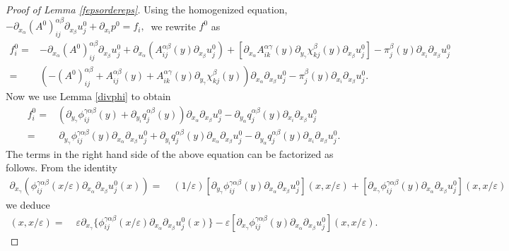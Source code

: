 \documentclass[11pt, reqno]{amsart}
\theoremstyle{definition}
\theoremstyle{remark}
\numberwithin{equation}{section}
\begin{document}
\begin{proof}[Proof  of \textup{Lemma \ref{fepsordereps}}]
		\noindent 	Using the homogenized equation,  $	-\partial_{x_\alpha}(A^0)^{\alpha\beta}_{ij}\partial_{x_\beta}	\! u_j^0   +  \partial_{x_i} p^0 =f_i,\ $    we rewrite  $f^0$ as
		\begin{align*}
			f_i^0=&-\partial_{x_\alpha}(A^0)^{\alpha\beta}_{ij}\partial_{x_\beta}	\! u_j^0 +\partial_{x_\alpha}\left(A^{\alpha\beta}_{ij}(y)\partial_{x_\beta}	\! u_j^0 \right) + [ \partial_{x_\alpha} A^{\alpha\gamma}_{ik}(y)\partial_{y_\gamma}	\chi^{\beta}_{kj}(y)\partial_{ x_{\beta}}  u^0_j]-  \pi^{\beta}_{j}(y)\partial_{x_i} \partial_{ x_{\beta}}  u^0_j\\
			=&\left(  - (A^0)^{\alpha\beta}_{ij} +A^{\alpha\beta}_{ij}(y) +   A^{\alpha\gamma}_{ik}(y)\partial_{y_\gamma}	\chi^{\beta}_{kj}(y)  \right) \partial_{x_\alpha} \partial_{ x_{\beta}}  u^0_j-  \pi^{\beta}_{j}(y)\partial_{x_i} \partial_{ x_{\beta}}  u^0_j.
		\end{align*}  
		Now we use Lemma \ref{divphi} to obtain
		\begin{align*}
			f_i^0=& \left(\partial_{y_\gamma} \phi^{\gamma\alpha\beta}_{ij}(y) + \partial_{y_i} q^{\alpha\beta}_{j} (y)  \right) \partial_{x_\alpha}  \partial_{x_\beta} u_j^0  -\partial_{y_\alpha}q^{\alpha\beta}_{j}(y) \partial_{ x_i}\partial_{ x_{\beta}}  u^0_j\\
			=	& \,\partial_{y_\gamma} \phi^{\gamma\alpha\beta}_{ij}(y)\partial_{x_\alpha}\partial_{x_\beta} u_j^0  + \partial_{y_i} q^{\alpha\beta}_{j} (y)\partial_{x_\alpha}\partial_{x_\beta} u_j^0  -\partial_{y_\alpha}q^{\alpha\beta}_{j}(y) \partial_{ x_i}\partial_{ x_{\beta}}  u^0_j.
		\end{align*} 
		The terms in the right hand side of the above equation can be factorized as follows. From the identity 
		\begin{align*}
		\partial_{x_\gamma}\!\left( \phi^{\gamma\alpha\beta}_{ij}\!(x/\varepsilon)\partial_{x_\alpha}\!\partial_{x_\beta} u_j^0(x) \right)\! =&\: (1/\varepsilon)[  \partial_{y_\gamma}  \phi^{\gamma\alpha\beta}_{ij}(y)\partial_{x_\alpha}\!\partial_{x_\beta} u_j^0] (x,x/\varepsilon) +  [  \partial_{x_\gamma}  \phi^{\gamma\alpha\beta}_{ij}(y)\partial_{x_\alpha}\!\partial_{x_\beta} u_j^0] (x,x/\varepsilon)
		\end{align*}
		we deduce
		\begin{align*}
			[ \partial_{y_\gamma} \phi^{\gamma\alpha\beta}_{ij}(y)\partial_{x_\alpha}\partial_{x_\beta} u_j^0] (x,x/\varepsilon) =&\; \varepsilon \partial_{x_\gamma} \{ \phi^{\gamma\alpha\beta}_{ij}(x/\varepsilon)\partial_{x_\alpha}\partial_{x_\beta} u_j^0(x) \} - \varepsilon [  \partial_{x_\gamma}  \phi^{\gamma\alpha\beta}_{ij}(y)\partial_{x_\alpha}\partial_{x_\beta} u_j^0] (x,x/\varepsilon).

\end{align*}
\end{proof}
\end{document}
